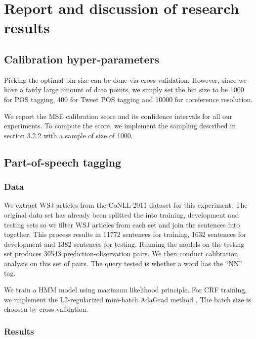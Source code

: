 \chapter{Report and discussion of research results}

\section{Calibration hyper-parameters}

Picking the optimal bin size can be done via cross-validation. However, since we have a fairly large amount of data points, we simply set the bin size to be 1000 for POS tagging, 400 for Tweet POS tagging and 10000 for coreference resolution. 

We report the MSE calibration score and its confidence intervals for all our experiments. To compute the score, we implement the sampling described in section 3.2.2 with a sample of size of 1000.



\section{Part-of-speech tagging}

\subsection{Data}

We extract WSJ articles from the CoNLL-2011 dataset for this experiment. The original data set has already been splitted the into training, development and testing sets so we filter WSJ articles from each set and join the sentences into together. This process results in 11772 sentences for training, 1632 sentences for development and 1382 sentences for testing. Running the models on the testing set produces 30543 prediction-observation pairs. We then conduct calibration analysis on this set of pairs. The query tested is whether a word has the ``NN'' tag. 

We train a HMM model using maximum likelihood principle. For CRF training, we implement the L2-regularized mini-batch AdaGrad method \citep{duchi2011adaptive}. The batch size is choosen by cross-validation.   

\subsection{Results}

